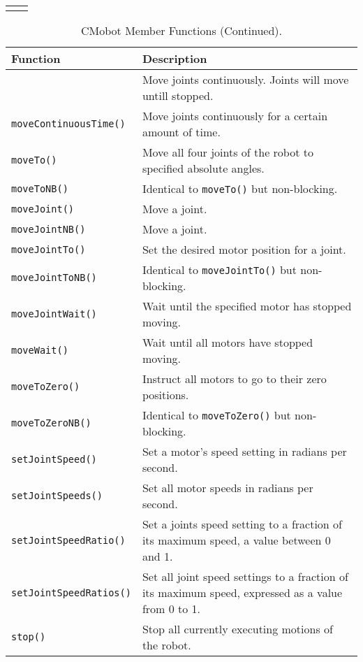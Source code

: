 \begin{table}[!h]
\begin{center}
\begin{tabular}{p{38 mm}p{110 mm}}
\begin{comment}
\hline
\end{tabular}
\end{center}
\label{mobilec_api_cbinary}
\end{table}

\addtocounter{table}{-1}
\begin{table}[!H]
\begin{center}
\caption{CMobot Member Functions (Continued).}
\begin{tabular}{p{38 mm}p{77 mm}}
\hline
Function & Description \\
\hline
\end{comment}

\texttt{moveContinuousNB()} & Move joints continuously. Joints will move untill stopped.\\
\texttt{moveContinuousTime()} & Move joints continuously for a certain amount of time.\\
\texttt{moveTo()} & Move all four joints of the robot to specified absolute angles. \\
\texttt{moveToNB()} & Identical to \texttt{moveTo()} but non-blocking. \\
\texttt{moveJoint()} & Move a joint. \\
\texttt{moveJointNB()} & Move a joint. \\
\texttt{moveJointTo()} & Set the desired motor position for a joint. \\
\texttt{moveJointToNB()} & Identical to \texttt{moveJointTo()} but non-blocking. \\
\texttt{moveJointWait()} & Wait until the specified motor has stopped moving. \\
\texttt{moveWait()} & Wait until all motors have stopped moving. \\
\texttt{moveToZero()} & Instruct all motors to go to their zero positions. \\
\texttt{moveToZeroNB()} & Identical to \texttt{moveToZero()} but non-blocking. \\
\texttt{setJointSpeed()} & Set a motor's speed setting in radians per second. \\
\texttt{setJointSpeeds()} & Set all motor speeds in radians per second. \\
\texttt{setJointSpeedRatio()} & Set a joints speed setting to a fraction of its maximum speed, a value between 0 and 1. \\
\texttt{setJointSpeedRatios()} & Set all joint speed settings to a fraction of its
maximum speed, expressed as a value from 0 to 1. \\
\texttt{stop()} & Stop all currently executing motions of the robot. \\
\hline
\end{tabular}
\end{center}
\label{mobilec_api_cbinary}
\end{table}

